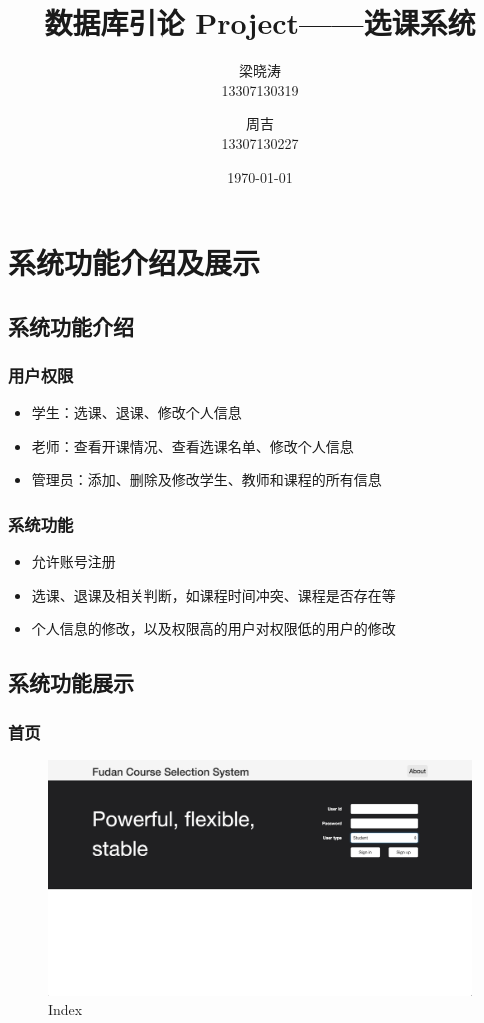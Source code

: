 \documentclass[a4paper, 11pt, nofonts, nocap, fancyhdr]{ctexart}
\title{数据库引论 Project——选课系统}
\author
{
	梁晓涛\\
	13307130319
	\and
	周吉\\
	13307130227
}
\date{\today}
\begin{document}
\maketitle
\tableofcontents
\setcounter{page}{0}
\thispagestyle{empty}
\newpage

\section{系统功能介绍及展示}

\subsection{系统功能介绍}

\subsubsection{用户权限}
\begin{itemize}
    \item 学生：选课、退课、修改个人信息
    \item 老师：查看开课情况、查看选课名单、修改个人信息
    \item 管理员：添加、删除及修改学生、教师和课程的所有信息
\end{itemize}

\subsubsection{系统功能}
\begin{itemize}
    \item 允许账号注册
    \item 选课、退课及相关判断，如课程时间冲突、课程是否存在等
    \item 个人信息的修改，以及权限高的用户对权限低的用户的修改
\end{itemize}

\subsection{系统功能展示}

\subsubsection{首页}

	\begin{figure}[ht]
		\centering
		\includegraphics[width=6in]{overview}
		\caption{Index}
	\end{figure}
\end{document}
